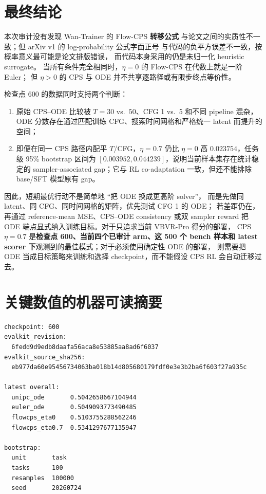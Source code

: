 \documentclass[11pt,a4paper]{article}
\begin{document}
\section{最终结论}

本次审计没有发现 Wan-Trainer 的 Flow-CPS \textbf{转移公式}
与论文之间的实质性不一致；但 arXiv v1 的 log-probability 公式字面正号
与代码的负平方误差不一致，按概率意义最可能是论文排版错误，
而代码本身采用的仍是未归一化 heuristic surrogate。
当所有条件完全相同时，$\eta=0$ 的 Flow-CPS 在代数上就是一阶 Euler；
但 $\eta>0$ 的 CPS 与 ODE 并不共享逐路径或有限步终点等价性。

检查点 600 的数据同时支持两个判断：

\begin{enumerate}
  \item 原始 CPS--ODE 比较被 $T=30$ vs.\ $50$、CFG 1 vs.\ 5 和不同 pipeline
  混杂，ODE 分数存在通过匹配训练 CFG、搜索时间网格和严格统一 latent 而提升的空间；
  \item 即便在同一 CPS 路径内配平 $T$/CFG，$\eta=0.7$ 仍比 $\eta=0$
  高 $0.023754$，任务级 95\% bootstrap 区间为
  $[0.003952,0.044239]$，说明当前样本集存在统计稳定的
  sampler-associated gap；它与 RL co-adaptation 一致，但还不能排除
  base/SFT 模型原有 gap。
\end{enumerate}

因此，短期最优行动不是简单地 ``把 ODE 换成更高阶 solver''，
而是先做同 latent、同 CFG、同时间网格的矩阵，优先测试 CFG 1 的 ODE；
若差距仍在，再通过 reference-mean MSE、CPS--ODE consistency 或双 sampler reward
把 ODE 端点显式纳入训练目标。对于只追求当前 VBVR-Pro 得分的部署，
CPS $\eta=0.7$ 是\textbf{检查点 600、当前四个已审计 arm、这 500 个 bench
样本和 latest scorer 下}观测到的最佳模式；对于必须使用确定性 ODE 的部署，
则需要把 ODE 当成目标策略来训练和选择 checkpoint，而不能假设 CPS RL
会自动迁移过去。

\appendix

\section{关键数值的机器可读摘要}

\begin{verbatim}
checkpoint: 600
evalkit_revision:
  6fedd9d9edb8daafa56aca8e53885aa8ad6f6037
evalkit_source_sha256:
  eb977da60e95456734063ba018b14d805680179fdf0e3e3b2ba6f603f27a935c

latest overall:
  unipc_ode       0.5042658667104944
  euler_ode       0.5049093773490485
  flowcps_eta0    0.5103755288562246
  flowcps_eta0.7  0.5341297677135947

bootstrap:
  unit       task
  tasks      100
  resamples  100000
  seed       20260724
\end{verbatim}
\end{document}
